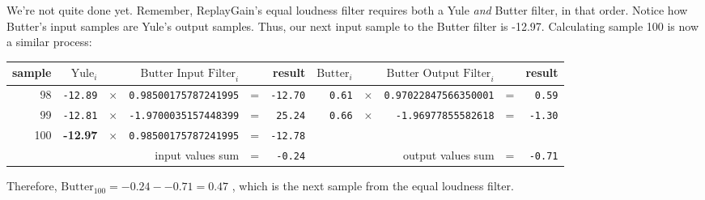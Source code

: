 We're not quite done yet.
Remember, ReplayGain's equal loudness filter requires both
a Yule \textit{and} Butter filter, in that order.
Notice how Butter's input samples are Yule's output samples.
Thus, our next input sample to the Butter filter is -12.97.
Calculating sample 100 is now a similar process:
\begin{table}[h]
{
\begin{tabular}{|r|rcrcr|rcrcr|}
\hline
sample & $\text{Yule}_i$ & & $\text{Butter Input Filter}_i$ & & result &
$\text{Butter}_i$ & & $\text{Butter Output Filter}_i$ & & result \\
\hline
98 & \texttt{-12.89} & $\times$ & \texttt{0.98500175787241995} & = & \texttt{-12.70} &
\texttt{0.61} & $\times$ & \texttt{0.97022847566350001} & = & \texttt{0.59} \\

99 & \texttt{-12.81} & $\times$ & \texttt{-1.9700035157448399} & = & \texttt{25.24} &
\texttt{0.66} & $\times$ & \texttt{-1.96977855582618} & = & \texttt{-1.30} \\

100 & \textbf{-12.97} & $\times$ & \texttt{0.98500175787241995} & = & \texttt{-12.78} &
& & & & \\
\hline
\multicolumn{4}{|r}{input values sum} & = & \texttt{-0.24} &
\multicolumn{3}{r}{output values sum} & = & \texttt{-0.71} \\
\hline
\end{tabular}
}
\end{table}
\par
\noindent
Therefore, $\text{Butter}_{100} = -0.24 - -0.71 = 0.47$
, which is the next sample from the equal loudness filter.


